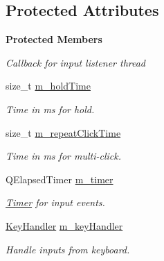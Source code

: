 \subsection*{Protected Attributes}
\begin{Indent}\textbf{ Protected Members}\par
{\em Callback for input listener thread }\begin{DoxyCompactItemize}
\item 
\mbox{\label{classrev_1_1_input_handler_afd18a482da80957ec4931b8aeb6ea8aa}} 
size\+\_\+t \mbox{\hyperlink{classrev_1_1_input_handler_afd18a482da80957ec4931b8aeb6ea8aa}{m\+\_\+hold\+Time}}
\begin{DoxyCompactList}\small\item\em Time in ms for hold. \end{DoxyCompactList}\item 
\mbox{\label{classrev_1_1_input_handler_a70d1d4d6fbb97a16c5509d6e078258fa}} 
size\+\_\+t \mbox{\hyperlink{classrev_1_1_input_handler_a70d1d4d6fbb97a16c5509d6e078258fa}{m\+\_\+repeat\+Click\+Time}}
\begin{DoxyCompactList}\small\item\em Time in ms for multi-\/click. \end{DoxyCompactList}\item 
\mbox{\label{classrev_1_1_input_handler_ad9f51e32bce0daa48f7fe3b0a1bc0848}} 
Q\+Elapsed\+Timer \mbox{\hyperlink{classrev_1_1_input_handler_ad9f51e32bce0daa48f7fe3b0a1bc0848}{m\+\_\+timer}}
\begin{DoxyCompactList}\small\item\em \mbox{\hyperlink{classrev_1_1_timer}{Timer}} for input events. \end{DoxyCompactList}\item 
\mbox{\label{classrev_1_1_input_handler_a000803a41ced7ae61b39a979a90d8aec}} 
\mbox{\hyperlink{classrev_1_1_key_handler}{Key\+Handler}} \mbox{\hyperlink{classrev_1_1_input_handler_a000803a41ced7ae61b39a979a90d8aec}{m\+\_\+key\+Handler}}
\begin{DoxyCompactList}\small\item\em Handle inputs from keyboard. \end{DoxyCompactList}\item 

\end{DoxyCompactItemize}
\end{Indent}
